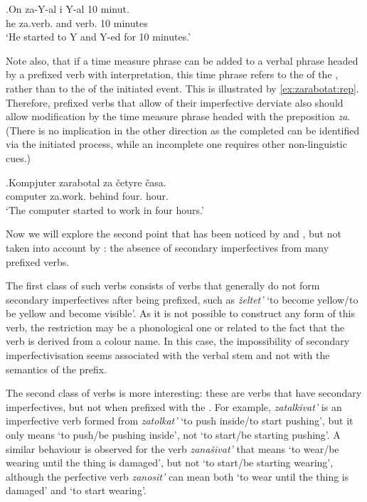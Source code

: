 \exg.\label{context:za:inch}On za-Y-al i Y-al 10 minut.\\
he za.verb. and verb. 10 minutes\\
\trans `He started to Y and Y-ed for 10 minutes.'

Note also, that if a time measure phrase can be added to a verbal phrase headed by a prefixed verb with  interpretation, this time phrase refers to the  of the , rather than to the  of the initiated event. This is illustrated by \ref{ex:zarabotat:rep}. Therefore,  prefixed verbs that allow  of their imperfective derviate also should allow modification by the time measure phrase headed with the preposition \textit{za}. (There is no implication in the other direction as the completed  can be identified via the initiated process, while an incomplete one requires other non-linguistic cues.)

\exg.\label{ex:zarabotat:rep}Kompjuter zarabotal za \v{c}etyre \v{c}asa.\\
computer za.work. behind four. hour.\\
\trans `The computer started to work in four hours.'

Now we will explore the second point that has been noticed by \citet{Svenonius:04b} and \citet{Braginsky:08}, but not taken into account by \citet{Tatevosov:09}: the absence of secondary imperfectives from many  prefixed verbs. 

The first class of such verbs consists of verbs that generally do not form secondary imperfectives after being prefixed, such as \textit{\v{z}eltet'} `to become yellow/to be yellow and become visible'. As it is not possible to construct any  form of this verb, the restriction may be a phonological one or related to the fact that the verb is derived from a colour name. In this case, the impossibility of secondary imperfectivisation seems associated with the verbal stem and not with the  semantics of the prefix. 

The second class of verbs is more interesting: these are verbs that have secondary imperfectives, but not when prefixed with the  . For example, \textit{zatalkivat'} is an imperfective verb formed from \textit{zatolkat'} `to push inside/to start pushing', but it only means `to push/be pushing inside', not `to start/be starting pushing'. A similar behaviour is observed for the verb \textit{zana\v{s}ivat'} that means `to wear/be wearing until the thing is damaged', but not `to start/be starting wearing', although the perfective verb \textit{zanosit'} can mean both `to wear until the thing is damaged' and `to start wearing'.


